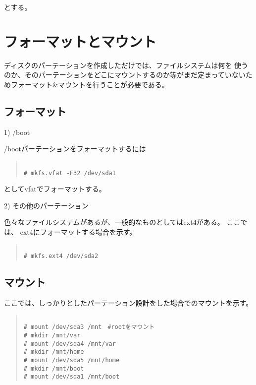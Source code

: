 \documentclass[dvipdfmx]{jsarticle}
\begin{document}
とする。


\section{フォーマットとマウント}

ディスクのパーテーションを作成しただけでは、ファイルシステムは何を
使うのか、そのパーテーションをどこにマウントするのか等がまだ定まっていないためフォーマット\&マウントを行うことが必要である。

\subsection{フォーマット}

1) /boot

/bootパーテーションをフォーマットするには


\begin{quote}
\begin{verbatim}

# mkfs.vfat -F32 /dev/sda1

\end{verbatim}
\end{quote}

としてvfatでフォーマットする。

2) その他のパーテーション

色々なファイルシステムがあるが、一般的なものとしてはext4がある。
ここでは、 ext4にフォーマットする場合を示す。

\begin{quote}
\begin{verbatim}

# mkfs.ext4 /dev/sda2

\end{verbatim}
\end{quote}

\subsection{マウント}

ここでは、しっかりとしたパーテーション設計をした場合でのマウントを示す。

\begin{quote}
\begin{verbatim}

# mount /dev/sda3 /mnt　#rootをマウント
# mkdir /mnt/var
# mount /dev/sda4 /mnt/var
# mkdir /mnt/home
# mount /dev/sda5 /mnt/home
# mkdir /mnt/boot
# mount /dev/sda1 /mnt/boot

\end{verbatim}
\end{quote}
\end{document}
